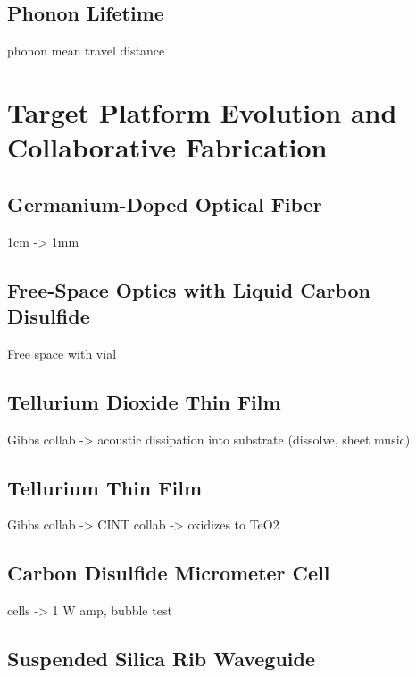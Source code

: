\subsection{Phonon Lifetime}
\label{subsec:Raman:PhononLifetime}

phonon mean travel distance


\section{Target Platform Evolution and Collaborative Fabrication}
\label{sec:Raman:TargetPlatforms}

\subsection{Germanium-Doped Optical Fiber}
\label{subsec:Raman:Target:UHNA3}

1cm -> 1mm

\subsection{Free-Space Optics with Liquid Carbon Disulfide}
\label{subsec:Raman:Target:CS2Vial}

Free space with vial

\subsection{Tellurium Dioxide Thin Film}
\label{subsec:Raman:Target:TeO2}

Gibbs collab -> acoustic dissipation into substrate (dissolve, sheet music)

\subsection{Tellurium Thin Film}
\label{subsec:Raman:Target:Te}

Gibbs collab -> CINT collab -> oxidizes to TeO2

\subsection{Carbon Disulfide Micrometer Cell}
\label{subsec:Raman:Target:CS2Cells}

cells -> 1 W amp, bubble test

\subsection{Suspended Silica Rib Waveguide}
\label{subsec:Raman:Target:Waveguide}


